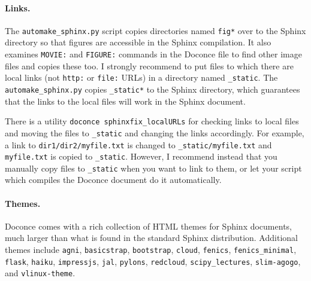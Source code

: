 \documentclass[%
oneside,                 %
final,                   %
10pt]{article}
\begin{document}
\paragraph{Links.}
The {\fontsize{10pt}{10pt}\Verb!automake_sphinx.py!} script copies directories named {\fontsize{10pt}{10pt}\Verb!fig*!}
over to the Sphinx directory so that figures are accessible
in the Sphinx compilation.  It also examines {\fontsize{10pt}{10pt}\Verb!MOVIE:!} and {\fontsize{10pt}{10pt}\Verb!FIGURE:!}
commands in the Doconce file to find other image files and copies
these too. I strongly recommend to put files
to which there are local links (not {\fontsize{10pt}{10pt}\Verb!http:!} or {\fontsize{10pt}{10pt}\Verb!file:!} URLs) in
a directory named {\fontsize{10pt}{10pt}\Verb!_static!}. The {\fontsize{10pt}{10pt}\Verb!automake_sphinx.py!} copies
{\fontsize{10pt}{10pt}\Verb!_static*!} to the Sphinx directory, which guarantees that the links
to the local files will work in the Sphinx document.

There is a utility {\fontsize{10pt}{10pt}\Verb!doconce sphinxfix_localURLs!} for checking links to
local files and moving the files to {\fontsize{10pt}{10pt}\Verb!_static!} and changing the links
accordingly. For example, a link to {\fontsize{10pt}{10pt}\Verb!dir1/dir2/myfile.txt!} is changed
to {\fontsize{10pt}{10pt}\Verb!_static/myfile.txt!} and {\fontsize{10pt}{10pt}\Verb!myfile.txt!} is copied to {\fontsize{10pt}{10pt}\Verb!_static!}.
However, I recommend instead that you manually copy
files to {\fontsize{10pt}{10pt}\Verb!_static!} when you want to link to them, or let your
script which compiles the Doconce document do it automatically.

\paragraph{Themes.}
Doconce comes with a rich collection of HTML themes for Sphinx documents,
much larger than what is found in the standard Sphinx distribution.
Additional themes include
{\fontsize{10pt}{10pt}\Verb!agni!},
{\fontsize{10pt}{10pt}\Verb!basicstrap!},
{\fontsize{10pt}{10pt}\Verb!bootstrap!},
{\fontsize{10pt}{10pt}\Verb!cloud!},
{\fontsize{10pt}{10pt}\Verb!fenics!},
{\fontsize{10pt}{10pt}\Verb!fenics_minimal!},
{\fontsize{10pt}{10pt}\Verb!flask!},
{\fontsize{10pt}{10pt}\Verb!haiku!},
{\fontsize{10pt}{10pt}\Verb!impressjs!},
{\fontsize{10pt}{10pt}\Verb!jal!},
{\fontsize{10pt}{10pt}\Verb!pylons!},
{\fontsize{10pt}{10pt}\Verb!redcloud!},
{\fontsize{10pt}{10pt}\Verb!scipy_lectures!},
{\fontsize{10pt}{10pt}\Verb!slim-agogo!}, and
{\fontsize{10pt}{10pt}\Verb!vlinux-theme!}.
\end{document}
